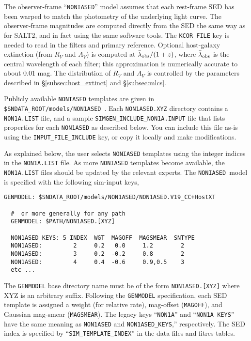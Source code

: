 \documentclass[12pt]{article}
\newcommand{\NONIA}{{\tt NONIASED}}
\newcommand{\lamobs}{\lambda_{\rm obs}}
\begin{document}

The observer-frame ``{\NONIA}'' model assumes that each
rest-frame SED has been warped to match the photometry of the
underlying light curve. The observer-frame magnitudes are
computed directly from the SED the same way as for SALT2,
and in fact using the same software tools.
The {\tt KCOR\_FILE} key is needed 
to read in the filters and primary reference. 
Optional host-galaxy extinction (from $R_V$ and $A_V$) is computed at 
$\bar\lamobs/(1+z)$, where $\bar\lamobs$ is the central wavelength 
of each filter;
this approximation is numerically accurate to about 0.01 mag.
The distribution of $R_V$ and $A_V$ is controlled by the
parameters described in \S\ref{subsec:host_extinct} and \S\ref{subsec:mlcs}.



Publicly available {\NONIA} templates are given in 
{\tt \$SNDATA\_ROOT/models/NON1ASED}~.
Each {\tt NON1ASED.XYZ} directory contains a {\tt NON1A.LIST} file,
and a sample {\tt SIMGEN\_INCLUDE\_NON1A.INPUT} file that lists
properties for each {\tt NON1ASED} as described below. 
You can include this file as-is using the
{\tt INPUT\_FILE\_INCLUDE} key, or copy it locally and make modifications.

\medskip
As explained below, the user selects {\NONIA} templates 
using the integer indices in the {\tt NON1A.LIST} file.
As more {\NONIA} templates become available, 
the {\tt NON1A.LIST} files should be updated by the relevant experts.
The \NONIA\ model is specified with the following sim-input keys,
%
\begin{Verbatim}[frame=single]
  GENMODEL: $SNDATA_ROOT/models/NON1ASED/NON1ASED.V19_CC+HostXT

  #  or more generally for any path
  GENMODEL: $PATH/NON1ASED.[XYZ]

  NON1ASED_KEYS: 5 INDEX  WGT  MAGOFF  MAGSMEAR  SNTYPE
  NON1ASED:         2     0.2   0.0     1.2        2
  NON1ASED:         3     0.2  -0.2     0.8        2
  NON1ASED:         4     0.4  -0.6     0.9,0.5    3
  etc ...
\end{Verbatim}
The {\tt GENMODEL} base directory name must be of the form {\tt NON1ASED.[XYZ]}
where XYZ is an arbitrary suffix.
Following the {\tt GENMODEL} specification, each SED template is assigned a
weight (for relative rate), mag-offset ({\tt MAGOFF}), and Gaussian mag-smear
({\tt MAGSMEAR}).
The legacy keys ``{\tt NON1A}'' and ``{\tt NON1A\_KEYS}''
have the same meaning as {\tt NON1ASED} and {\tt NON1ASED\_KEYS},''
respectively.
The SED index is specified by ``{\tt SIM\_TEMPLATE\_INDEX}'' in the data files and
fitres-tables.
\end{document}
